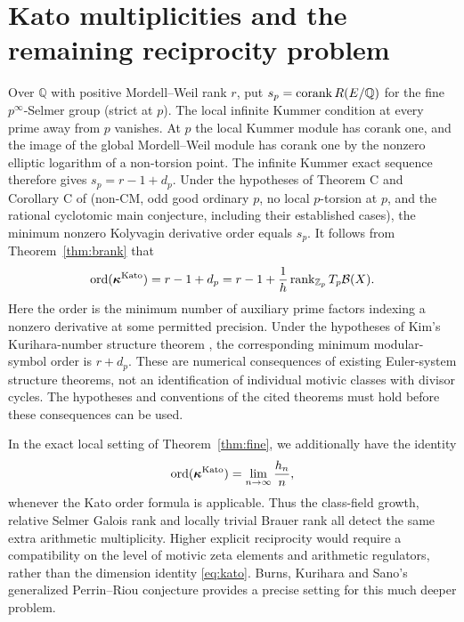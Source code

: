 \documentclass[11pt,a4paper]{article}
\theoremstyle{definition}\newtheorem{definition}[theorem]{Definition}
\theoremstyle{remark}\newtheorem{remark}[theorem]{Remark}
\newcommand{\ZZ}{\mathbb Z}\newcommand{\QQ}{\mathbb Q}\newcommand{\FF}{\mathbb F}
\numberwithin{equation}{section}
\begin{document}
\section{Kato multiplicities and the remaining reciprocity problem}
Over $\QQ$ with positive Mordell--Weil rank $r$, put $s_p=\corank R(E/\QQ)$ for the fine $p^\infty$-Selmer group (strict at $p$). The local infinite Kummer condition at every prime away from $p$ vanishes. At $p$ the local Kummer module has corank one, and the image of the global Mordell--Weil module has corank one by the nonzero elliptic logarithm of a non-torsion point. The infinite Kummer exact sequence therefore gives $s_p=r-1+d_p$. Under the hypotheses of Theorem C and Corollary C of \cite{BCGS} (non-CM, odd good ordinary $p$, no local $p$-torsion at $p$, and the rational cyclotomic main conjecture, including their established cases), the minimum nonzero Kolyvagin derivative order equals $s_p$. It follows from Theorem~\ref{thm:brank} that
\begin{equation}\label{eq:kato}
\ord(\boldsymbol\kappa^{\mathrm{Kato}})=r-1+d_p
=r-1+\frac{1}{h}\rk_{\ZZ_p}T_p\mathcal B(X).
\end{equation}
Here the order is the minimum number of auxiliary prime factors indexing a nonzero derivative at some permitted precision. Under the hypotheses of Kim's Kurihara-number structure theorem \cite{Kim}, the corresponding minimum modular-symbol order is $r+d_p$. These are numerical consequences of existing Euler-system structure theorems, not an identification of individual motivic classes with divisor cycles. The hypotheses and conventions of the cited theorems must hold before these consequences can be used.

In the exact local setting of Theorem~\ref{thm:fine}, we additionally have the identity
\[
\operatorname{ord}(\boldsymbol\kappa^{\mathrm{Kato}})=\lim_{n\to\infty}\frac{h_n}{n},
\]
whenever the Kato order formula is applicable. Thus the class-field growth, relative Selmer Galois rank and locally trivial Brauer rank all detect the same extra arithmetic multiplicity. Higher explicit reciprocity would require a compatibility on the level of motivic zeta elements and arithmetic regulators, rather than the dimension identity \eqref{eq:kato}. Burns, Kurihara and Sano's generalized Perrin--Riou conjecture \cite{BKS} provides a precise setting for this much deeper problem.
\end{document}
